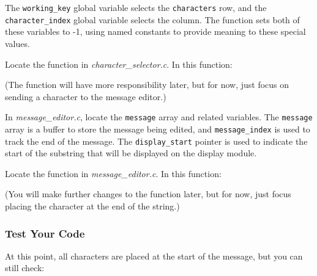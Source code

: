 The \lstinline{working_key} global variable selects the \lstinline{characters} row, and the \lstinline{character_index} global variable selects the column.
The  function sets both of these variables to -1, using named constants to provide meaning to these special values.

Locate the  function in \textit{character\_selector.c}.
In this function:
\begin{description}
    \begin{description}
    \end{description}
\end{description}
(The  function will have more responsibility later,
but for now, just focus on sending a character to the message editor.)

In \textit{message\_editor.c}, locate the \lstinline{message} array and related variables.
The \lstinline{message} array is a buffer to store the message being edited,
and \lstinline{message_index} is used to track the end of the message.
The \lstinline{display_start} pointer is used to indicate the start of the substring that will be displayed on the display module.

Locate the  function in \textit{message\_editor.c}.
In this function:
\begin{description}
\end{description}
(You will make further changes to the  function later,
but for now, just focus placing the character at the end of the string.)

\subsubsection{Test Your Code}

At this point, all characters are placed at the start of the message, but you can still check:
\begin{description}
\end{description}



